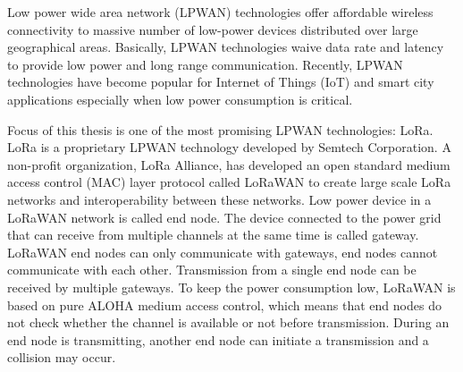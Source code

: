 Low power wide area network (LPWAN) technologies offer affordable wireless connectivity to massive number of low-power devices distributed over large geographical areas. Basically, LPWAN technologies waive data rate and latency to provide low power and long range communication. Recently, LPWAN technologies have become popular for Internet of Things (IoT) and smart city applications especially when low power consumption is critical.

Focus of this thesis is one of the most promising LPWAN technologies: LoRa. LoRa is a proprietary LPWAN technology developed by Semtech Corporation. A non-profit organization, LoRa Alliance, has developed an open standard medium access control (MAC) layer protocol called LoRaWAN to create large scale LoRa networks and interoperability between these networks. Low power device in a LoRaWAN network is called end node. The device connected to the power grid that can receive from multiple channels at the same time is called gateway. LoRaWAN end nodes can only communicate with gateways, end nodes cannot communicate with each other. Transmission from a single end node can be received by multiple gateways. To keep the power consumption low, LoRaWAN is based on pure ALOHA medium access control, which means that end nodes do not check whether the channel is available or not before transmission. During an end node is transmitting, another end node can initiate a transmission and a collision may occur.

